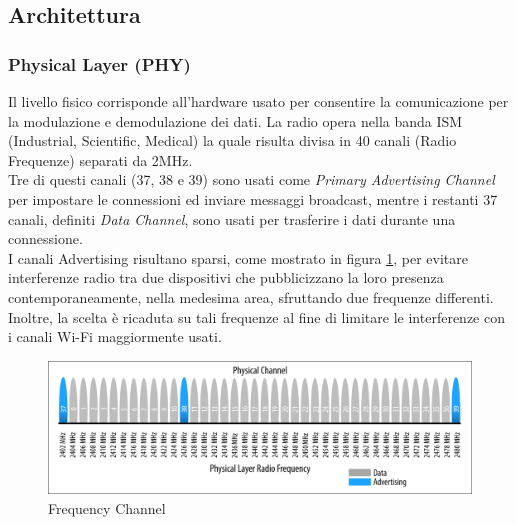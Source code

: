 \subsection{Architettura}
\subsubsection{Physical Layer (PHY)}
Il livello fisico corrisponde all'hardware usato per consentire la comunicazione per la modulazione e demodulazione dei dati. La radio opera nella banda ISM (Industrial, Scientific, Medical) la quale risulta divisa in 40 canali (Radio Frequenze) separati da 2MHz.\\
Tre di questi canali (37, 38 e 39) sono usati come \textit{Primary Advertising Channel} per impostare le connessioni ed inviare messaggi broadcast, mentre i restanti 37 canali, definiti \textit{Data Channel}, sono usati per trasferire i dati durante una connessione.\\

\noindent I canali Advertising risultano sparsi, come mostrato in figura \ref{fig:frequency_channel}, per evitare interferenze radio tra due dispositivi che pubblicizzano la loro presenza contemporaneamente, nella medesima area, sfruttando due frequenze differenti. Inoltre, la scelta è ricaduta su tali frequenze al fine di limitare le interferenze con i canali Wi-Fi maggiormente usati.

\begin{figure}[!ht]
    \centering
    \includegraphics[width = \textwidth]{images/Physical Channel BLE.png}
    \caption{Frequency Channel}
    \label{fig:frequency_channel}
\end{figure}

